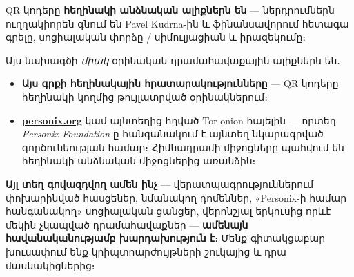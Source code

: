 \begin{minipage}[t]{0.60\textwidth}
\vspace{0pt}
\begin{mdframed}[
  linewidth=0.7pt,roundcorner=5pt,
  innerleftmargin=10pt,innerrightmargin=10pt,
  innertopmargin=8pt,innerbottommargin=8pt,
  skipabove=0pt,skipbelow=0pt,
  linecolor=cbwarning!50,backgroundcolor=cbwarning!5,
  nobreak=true,
  needspace=4\baselineskip,
]
\footnotesize
QR կոդերը \textbf{հեղինակի անձնական ալիքներն են} --- ներդրումներն ուղղակիորեն գնում են Pavel Kudrna-ին և ֆինանսավորում հետագա գրելը, սոցիալական փորձը / սիմուլյացիան և իրազեկումը։

\smallskip
Այս նախագծի \emph{միակ} օրինական դրամահավաքային ալիքներն են․

\smallskip
\begin{itemize}
\setlength{\itemsep}{0pt}
\setlength{\topsep}{0pt}
\item \textbf{Այս գրքի հեղինակային հրատարակությունները} --- QR կոդերը հեղինակի կողմից թույլատրված օրինակներում։
\item \href{https://personix.org}{\textbf{personix.org}} կամ այնտեղից հղված Tor onion հայելին --- որտեղ \emph{Personix Foundation}-ը հանգանակում է այնտեղ նկարագրված գործունեության համար։ Հիմնադրամի միջոցները պահվում են հեղինակի անձնական միջոցներից առանձին։
\end{itemize}

\smallskip
\textbf{Այլ տեղ գովազդվող ամեն ինչ} --- վերատպագրություններում փոխարինված հասցեներ, նմանակող դոմեններ, «Personix-ի համար հանգանակող» սոցիալական ցանցեր, վերոնշյալ երկուսից որևէ մեկին չկապված դրամահավաքներ --- \textbf{ամենայն հավանականությամբ խարդախություն է}։ Մենք գիտակցաբար խուսափում ենք կրիպտոարժույթների շուկայից և դրա մասնակիցներից։
\end{mdframed}
\end{minipage}

\clearpage
